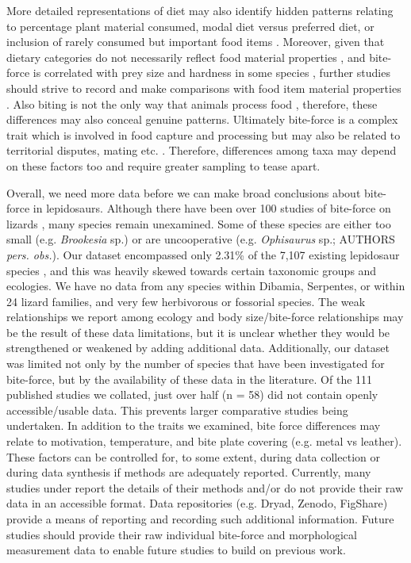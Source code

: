 \documentclass[a4paper, 12pt]{article}
\begin{document}
More detailed representations of diet \citep[e.g.][]{olsen2017feeding} may also identify hidden patterns relating to percentage plant material consumed, modal diet versus preferred diet, or inclusion of rarely consumed but important food items \citep{jones2012shearing}.
Moreover, given that dietary categories do not necessarily reflect food material properties \citep{lucas1984chewing,strait1997tooth}, and bite-force is correlated with prey size and hardness in some species \citep{aguirre2002ecomorphological}, further studies should strive to record and make comparisons with food item material properties \citep[e.g.][]{taverne2020proximate}.
Also biting is not the only way that animals process food \citep[e.g. tongue use, head shaking etc.;][]{mcbrayer2002prey}, therefore, these differences may also conceal genuine patterns. 
Ultimately bite-force is a complex trait which is involved in food capture and processing but may also be related to territorial disputes, mating etc. \citep{lailvaux2004performance,huyghe2005morphology,lappin2005weapon}. 
Therefore, differences among taxa may depend on these factors too and require greater sampling to tease apart. 

Overall, we need more data before we can make broad conclusions about bite-force in lepidosaurs. 
Although there have been over 100 studies of bite-force on lizards \citep{lappin2014reliable}, many species remain unexamined.
Some of these species are either too small (e.g. \textit{Brookesia} sp.) or are uncooperative (e.g. \textit{Ophisaurus} sp.; AUTHORS \textit{pers. obs.}). 
Our dataset encompassed only 2.31\% of the 7,107 existing lepidosaur species \citep{uetz2020reptile}, and this was heavily skewed towards certain taxonomic groups and ecologies. 
We have no data from any species within Dibamia, Serpentes, or within 24 lizard families, and very few herbivorous or fossorial species. 
The weak relationships we report among ecology and body size/bite-force relationships may be the result of these data limitations, but it is unclear whether they would be strengthened or weakened by adding additional data. 
Additionally, our dataset was limited not only by the number of species that have been investigated for bite-force, but by the availability of these data in the literature. 
Of the 111 published studies we collated, just over half (n = 58) did not contain openly accessible/usable data. 
This prevents larger comparative studies being undertaken. 
In addition to the traits we examined, bite force differences may relate to motivation, temperature, and bite plate covering (e.g. metal vs leather). 
These factors can be controlled for, to some extent, during data collection \citep{anderson2008bite,lappin2014reliable}or during data synthesis if methods are adequately reported. 
Currently, many studies under report the details of their methods and/or do not provide their raw data in an accessible format. 
Data repositories (e.g. Dryad, Zenodo, FigShare) provide a means of reporting and recording such additional information. 
Future studies should provide their raw individual bite-force and morphological measurement data \citep[e.g.][]{dufour2018ecological,jones2020reproductive,vzagar2017towards,herrel2014does} to enable future studies to build on previous work. 
\end{document}
